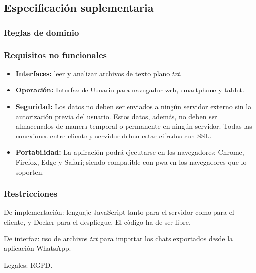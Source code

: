\subsection{Especificación suplementaria}
\label{subsect:suplementary-specification}

\subsubsection{Reglas de dominio}



\subsubsection{Requisitos no funcionales}

\begin{itemize}
	\item \textbf{Interfaces:} leer y analizar archivos de texto plano \textit{txt}. 
	
	\item \textbf{Operación:} Interfaz de Usuario para navegador web, smartphone y tablet.
	
	\item \textbf{Seguridad:} Los datos no deben ser enviados a ningún servidor externo sin la autorización previa del usuario. Estos datos, además, no deben ser almacenados de manera temporal o permanente en ningún servidor. Todas las conexiones entre cliente y servidor deben estar cifradas con SSL.
	
	\item \textbf{Portabilidad:} La aplicación podrá ejecutarse en los navegadores: Chrome, Firefox, Edge y Safari; siendo compatible con \acrshort{pwa} en los navegadores que lo soporten.
\end{itemize}

\subsubsection{Restricciones}
De implementación: lenguaje JavaScript tanto para el servidor como para el cliente, y Docker para el despliegue. El código ha de ser libre.

De interfaz: uso de archivos \textit{txt} para importar los chats exportados desde la aplicación WhatsApp. 

Legales: RGPD.










